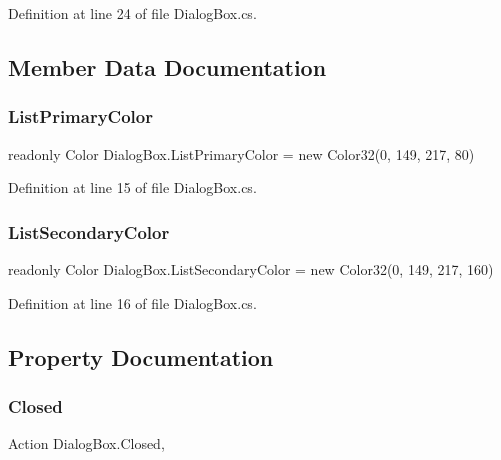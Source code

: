 Definition at line 24 of file Dialog\+Box.\+cs.



\subsection{Member Data Documentation}
\mbox{\label{class_dialog_box_a1e9c820a746c25aa4451f8d4c63f2178}} 
\subsubsection{\texorpdfstring{List\+Primary\+Color}{ListPrimaryColor}}
{\footnotesize\ttfamily readonly Color Dialog\+Box.\+List\+Primary\+Color = new Color32(0, 149, 217, 80)\hspace{0.3cm}{\ttfamily [static]}}



Definition at line 15 of file Dialog\+Box.\+cs.

\mbox{\label{class_dialog_box_a8f3879eebe2ba0418c35504c04c1c7c6}} 
\subsubsection{\texorpdfstring{List\+Secondary\+Color}{ListSecondaryColor}}
{\footnotesize\ttfamily readonly Color Dialog\+Box.\+List\+Secondary\+Color = new Color32(0, 149, 217, 160)\hspace{0.3cm}{\ttfamily [static]}}



Definition at line 16 of file Dialog\+Box.\+cs.



\subsection{Property Documentation}
\mbox{\label{class_dialog_box_a30361bc3dd01ebcf583344e2e5a8ca41}} 
\subsubsection{\texorpdfstring{Closed}{Closed}}
{\footnotesize\ttfamily Action Dialog\+Box.\+Closed\hspace{0.3cm}{\ttfamily [get]}, {\ttfamily [set]}}



